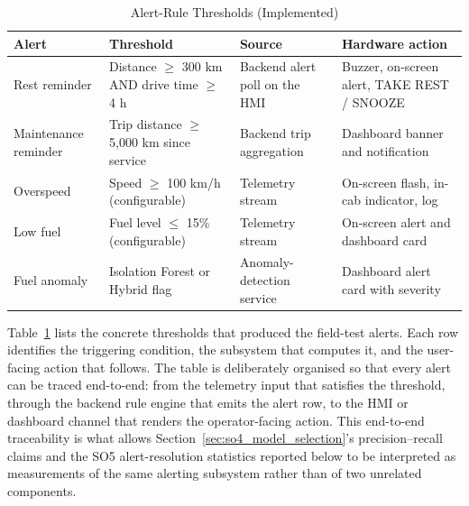 \begin{table}[!htbp]
\centering
\caption{Alert-Rule Thresholds (Implemented)}
\label{tab:so5_alert_rules}
\scriptsize
\setlength{\tabcolsep}{3pt}
\begin{tabular}{|p{}|p{}|p{}|p{}|}
\hline
\textbf{Alert} & \textbf{Threshold} & \textbf{Source} & \textbf{Hardware action} \\
\hline
Rest reminder & Distance $\geq$ 300 km AND drive time $\geq$ 4 h & Backend alert poll on the HMI & Buzzer, on-screen alert, TAKE REST / SNOOZE \\
\hline
Maintenance reminder & Trip distance $\geq$ 5{,}000 km since service & Backend trip aggregation & Dashboard banner and notification \\
\hline
Overspeed & Speed $\geq$ 100 km/h (configurable) & Telemetry stream & On-screen flash, in-cab indicator, log \\
\hline
Low fuel & Fuel level $\leq$ 15\% (configurable) & Telemetry stream & On-screen alert and dashboard card \\
\hline
Fuel anomaly & Isolation Forest or Hybrid flag & Anomaly-detection service & Dashboard alert card with severity \\
\hline
\end{tabular}
\normalsize
\end{table}

\noindent
Table~\ref{tab:so5_alert_rules} lists the concrete thresholds that produced the field-test alerts. Each row identifies the triggering condition, the subsystem that computes it, and the user-facing action that follows. The table is deliberately organised so that every alert can be traced end-to-end: from the telemetry input that satisfies the threshold, through the backend rule engine that emits the alert row, to the HMI or dashboard channel that renders the operator-facing action. This end-to-end traceability is what allows Section~\ref{sec:so4_model_selection}'s precision--recall claims and the SO5 alert-resolution statistics reported below to be interpreted as measurements of the same alerting subsystem rather than of two unrelated components.

